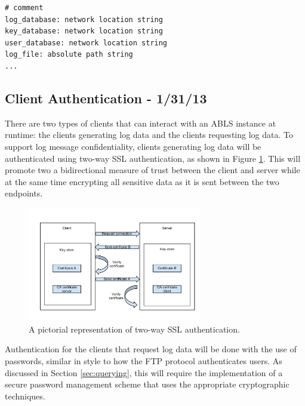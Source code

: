\documentclass{sig-alternate}
\begin{document}
\begin{lstlisting}
# comment
log_database: network location string
key_database: network location string
user_database: network location string
log_file: absolute path string
...
\end{lstlisting}

\subsection{Client Authentication - 1/31/13}
\label{sec:auth}
There are two types of clients that can interact with an ABLS instance at runtime: the clients generating log data and the
clients requesting log data. To support log message confidentiality, clients generating log data will be authenticated
using two-way SSL authentication, as shown in Figure \ref{fig:ssl}. This will promote two a bidirectional measure of 
trust between the client and server while at the same time encrypting all sensitive data as it is sent between the two 
endpoints.

\begin{figure}[ht!]
\begin{center}
\includegraphics[width=3in]{images/two_way_ssl.pdf}
\caption{A pictorial representation of two-way SSL authentication. }
\label{fig:ssl}
\end{center}
\end{figure}

Authentication for the clients that request log data will be done with the use of passwords, similar in style to how the 
FTP protocol authenticates users. As discussed in Section \ref{sec:querying}, this will require the implementation of 
a secure password management scheme that uses the appropriate cryptographic techniques. 

\end{document}
